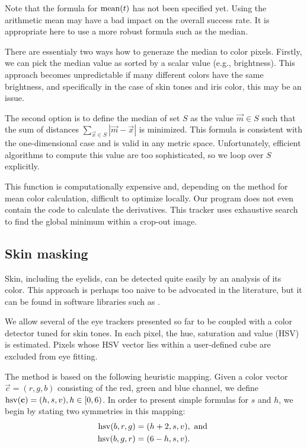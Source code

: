 Note that the formula for $\mathrm{mean}(t)$ has not been specified yet.
Using the arithmetic mean may have a bad impact on the overall success rate.
It is appropriate here to use a more robust formula such as the median.

There are essentialy two ways how to generaze the median to color pixels.
Firstly, we can pick the median value as sorted by a scalar value (e.g., brightness).
This approach becomes unpredictable if many different colors have the same brightness, and specifically in the case of skin tones and iris color, this may be an issue.

The second option is to define the median of set $S$ as the value $\vec m \in S$ such that the sum of distances $\sum_{\vec x \in S} |\vec m - \vec x|$ is minimized.
This formula is consistent with the one-dimensional case and is valid in any metric space.
Unfortunately, efficient algorithms to compute this value are too sophisticated, so we loop over $S$ explicitly.

This function is computationally expensive and, depending on the method for mean color calculation, difficult to optimize locally.
Our program does not even contain the code to calculate the derivatives.
This tracker uses exhaustive search to find the global minimum within a crop-out image.

\subsection{Skin masking}

Skin, including the eyelids, can be detected quite easily by an analysis of its color.
This approach is perhaps too naive to be advocated in the literature, but it can be found in software libraries such as \cite{deepgaze}.

We allow several of the eye trackers presented so far to be coupled with a color detector tuned for skin tones.
In each pixel, the hue, saturation and value (HSV) is estimated.
Pixels whose HSV vector lies within a user-defined cube are excluded from eye fitting.

The method is based on the following heuristic mapping.
Given a color vector $\vec c = (r, g, b)$ consisting of the red, green and blue channel, we define $\mathrm{hsv}(\mathbf{c}) = (h, s, v), h \in \lbrack 0, 6)$.
In order to present simple formulas for $s$ and $h$, we begin by stating two symmetries in this mapping:
\begin{align}
\mathrm{hsv}(b, r, g) &= (h + 2, s, v), \textrm{ and } \\
\mathrm{hsv}(b, g, r) &= (6 - h, s, v). \notag
\end{align}

